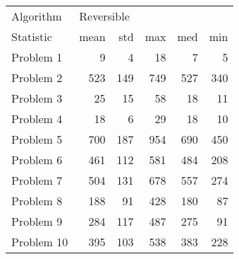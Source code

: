 \begin{tabular}{lrrrrr}
\toprule
Algorithm & \multicolumn{5}{l}{Reversible} \\
Statistic &       mean &  std &  max &  med &  min \\
\midrule
Problem 1  &          9 &    4 &   18 &    7 &    5 \\
Problem 2  &        523 &  149 &  749 &  527 &  340 \\
Problem 3  &         25 &   15 &   58 &   18 &   11 \\
Problem 4  &         18 &    6 &   29 &   18 &   10 \\
Problem 5  &        700 &  187 &  954 &  690 &  450 \\
Problem 6  &        461 &  112 &  581 &  484 &  208 \\
Problem 7  &        504 &  131 &  678 &  557 &  274 \\
Problem 8  &        188 &   91 &  428 &  180 &   87 \\
Problem 9  &        284 &  117 &  487 &  275 &   91 \\
Problem 10 &        395 &  103 &  538 &  383 &  228 \\
\bottomrule
\end{tabular}
